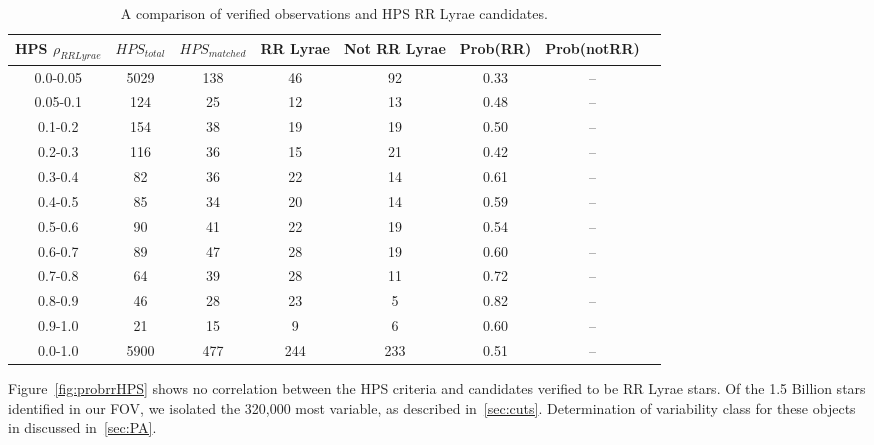 \documentclass[aps,prb,twocolumn,superscriptaddress]{revtex4-1}
\begin{document}
\begin{table}
	\begin{center}
		\begin{tabular}{|c|c|c|c|c|c|c|c|}\hline
HPS $\rho_{RRLyrae}$ & $HPS_{total}$ & $HPS_{matched}$ & RR Lyrae & Not RR Lyrae & Prob(RR) & Prob(notRR) \\ \hline
0.0-0.05 & 5029 & 138 & 46 		& 92 & 0.33 & -- \\ \hline
0.05-0.1 & 124 & 25 & 12 		& 13 & 0.48 & -- \\ \hline
0.1-0.2 & 154 & 38 & 19 		& 19 & 0.50 & -- \\ \hline
0.2-0.3 & 116 & 36 & 15 		& 21 & 0.42 & -- \\ \hline
0.3-0.4 & 82 & 36 & 22 			& 14 & 0.61 & -- \\ \hline
0.4-0.5 & 85 & 34 & 20			& 14 & 0.59 & -- \\ \hline
0.5-0.6 & 90 & 41 & 22			& 19 & 0.54 & -- \\ \hline
0.6-0.7 & 89 & 47 & 28			& 19 & 0.60 & -- \\ \hline
0.7-0.8 & 64 & 39 & 28 			& 11 & 0.72 & -- \\ \hline
0.8-0.9 & 46 & 28 & 23 			& 5 & 0.82 & -- \\ \hline
0.9-1.0 & 21 & 15 & 9			& 6 & 0.60 & -- \\ \hline
\hline
0.0-1.0 & 5900 & 477 & 244 & 233 & 0.51 & -- \\ \hline
		\end{tabular}
	\end{center}
\caption{ \small{A comparison of verified observations and HPS RR Lyrae candidates. \label{tab:HPSlim15}}}
\end{table}


Figure~\ref{fig:probrrHPS} shows no correlation between the HPS criteria and candidates verified to be RR Lyrae stars.  Of the 1.5 Billion stars identified in our FOV, we isolated the 320,000 most variable, 
as described in~\cref{sec:cuts}.  Determination of variability class for these objects in discussed in~\cref{sec:PA}.
\end{document}
